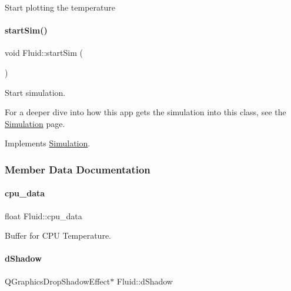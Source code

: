 Start plotting the temperature \mbox{\label{classFluid_af249a75d7ef113842c226b8b939c8f90}} 
\paragraph{\texorpdfstring{startSim()}{startSim()}}
{\footnotesize\ttfamily void Fluid\+::start\+Sim (\begin{DoxyParamCaption}{ }\end{DoxyParamCaption})\hspace{0.3cm}{\ttfamily [virtual]}}

Start simulation.

For a deeper dive into how this app gets the simulation into this class, see the \mbox{\hyperlink{classSimulation}{Simulation}} page. 

Implements \mbox{\hyperlink{classSimulation_ac523544ffc2b4cffed1d2a6ead5809b1}{Simulation}}.



\subsubsection{Member Data Documentation}
\mbox{\label{classFluid_a596fd99b82b4553495b12f353488848e}} 
\paragraph{\texorpdfstring{cpu\_data}{cpu\_data}}
{\footnotesize\ttfamily float Fluid\+::cpu\+\_\+data\hspace{0.3cm}{\ttfamily [private]}}



Buffer for C\+PU Temperature. 

\mbox{\label{classFluid_a3e51c9ed538056955fd16efd6b8519a2}} 
\paragraph{\texorpdfstring{dShadow}{dShadow}}
{\footnotesize\ttfamily Q\+Graphics\+Drop\+Shadow\+Effect$\ast$ Fluid\+::d\+Shadow\hspace{0.3cm}{\ttfamily [private]}}

